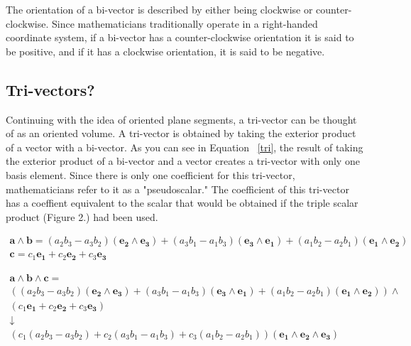 \documentclass{amsart}
\begin{document}
			The orientation of a bi-vector is described by either being clockwise or counter-clockwise. Since mathematicians traditionally operate in a right-handed coordinate system, if a bi-vector has a counter-clockwise orientation it is said to be positive, and if it has a clockwise orientation, it is said to be negative.
			
		\subsection{Tri-vectors?}
			Continuing with the idea of oriented plane segments, a tri-vector can be thought of as an oriented volume. A tri-vector is obtained by taking the exterior product of a vector with a bi-vector. As you can see in Equation ~\ref{tri}, the result of taking the exterior product of a bi-vector and a vector creates a tri-vector with only one basis element. Since there is only one coefficient for this tri-vector, mathematicians refer to it as a "pseudoscalar." The coefficient of this tri-vector has a coeffient equivalent to the scalar that would be obtained if the triple scalar product (Figure 2.) had been used.
			
			\begin{gather*}
				\mathbf{a} \wedge \mathbf{b} = (a_2 b_3 - a_3 b_2)(\mathbf{e_2} \wedge \mathbf{e_3}) + (a_3 b_1 - a_1 b_3)(\mathbf{e_3} \wedge \mathbf{e_1}) + (a_1 b_2 - a_2 b_1)(\mathbf{e_1} \wedge \mathbf{e_2})\\
				\mathbf{c} = c_1 \mathbf{e_1} + c_2 \mathbf{e_2} + c_3 \mathbf{e_3}
			\end{gather*}
			
			\begin{gather}
				\label{tri}
				\mathbf{a} \wedge \mathbf{b} \wedge \mathbf{c} =\\ \nonumber
				((a_2 b_3 - a_3 b_2)(\mathbf{e_2} \wedge \mathbf{e_3}) + (a_3 b_1 - a_1 b_3)(\mathbf{e_3} \wedge \mathbf{e_1}) + (a_1 b_2 - a_2 b_1)(\mathbf{e_1} \wedge \mathbf{e_2})) \wedge \\ \nonumber
				(c_1 \mathbf{e_1} + c_2 \mathbf{e_2} + c_3 \mathbf{e_3}) \\ \nonumber
				\downarrow \\ \nonumber
				(c_1(a_2 b_3 - a_3 b_2) + c_2(a_3 b_1 - a_1 b_3) + c_3(a_1 b_2 - a_2 b_1))(\mathbf{e_1} \wedge \mathbf{e_2} \wedge \mathbf{e_3}) \nonumber
			\end{gather}
	
\end{document}
